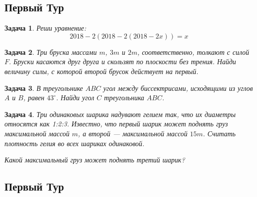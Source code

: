 \documentclass[a4paper, 12pt]{article}
\theoremstyle{break}
\newtheorem{problem}{Задача}[subsection]
\begin{document}
\thispagestyle{empty}
\subsection*{Первый Тур}


\begin{problem}
Реши уравнение:
\[
2018 − 2(2018 − 2(2018 − 2x)) = x
\]
\end{problem}

\begin{problem}
Три бруска массами $m$, $3m$ и $2m$, соответственно, толкают с силой $F$.
Бруски касаются друг друга и скользят по плоскости без трения.
Найди величину силы, с которой второй брусок действует на первый.

\begin{minipage}{0.8\textwidth}
\begin{center}
\end{center}
\end{minipage}
\end{problem}


\begin{problem}
В треугольнике $ABC$ угол между биссектрисами, исходящими из углов $A$ и $B$,
равен $43^{\circ}$. Найди угол $C$ треугольника $ABC$.
\end{problem}


\begin{problem}
Три одинаковых шарика надувают гелием так, что их диаметры относятся как 1:2:3.
Известно, что первый шарик может поднять груз максимальной массой $m$,
а второй — максимальной массой $15m$. Считать плотность гелия во всех шариках одинаковой.

Какой максимальный груз может поднять третий шарик?
\end{problem}

\subsection*{Первый Тур}
\setcounter{problem}{0}
\end{document}
